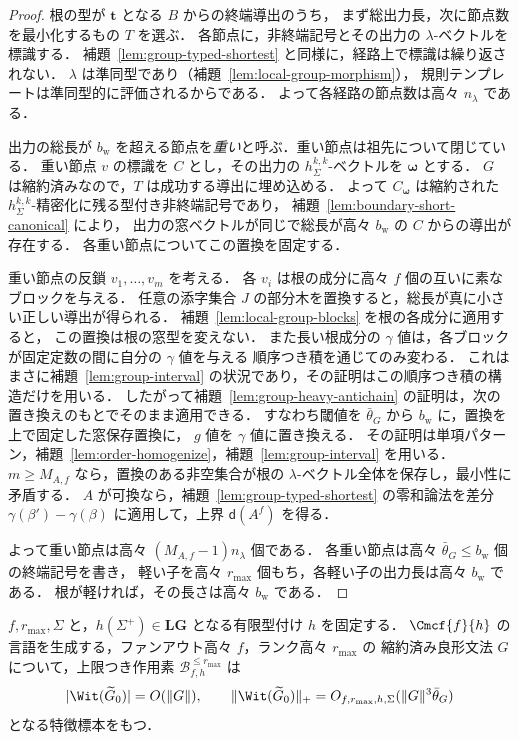 \begin{proof}
根の型が $\mathbf t$ となる $B$ からの終端導出のうち，
まず総出力長，次に節点数を最小化するもの $T$ を選ぶ．
各節点に，非終端記号とその出力の $\lambda$-ベクトルを標識する．
補題~\ref{lem:group-typed-shortest} と同様に，経路上で標識は繰り返されない．
$\lambda$ は準同型であり（補題~\ref{lem:local-group-morphism}），
規則テンプレートは準同型的に評価されるからである．
よって各経路の節点数は高々 $n_\lambda$ である．

出力の総長が $b_{\mathrm w}$ を超える節点を\emph{重い}と呼ぶ．重い節点は祖先について閉じている．
重い節点 $v$ の標識を $C$ とし，その出力の $h^{k,k}_\Sigma$-ベクトルを $\boldsymbol\omega$ とする．
$G$ は縮約済みなので，$T$ は成功する導出に埋め込める．
よって $C_{\boldsymbol\omega}$ は縮約された $h^{k,k}_\Sigma$-精密化に残る型付き非終端記号であり，
補題~\ref{lem:boundary-short-canonical} により，
出力の窓ベクトルが同じで総長が高々 $b_{\mathrm w}$ の $C$ からの導出が存在する．
各重い節点についてこの置換を固定する．

重い節点の反鎖 $v_1,\ldots,v_m$ を考える．
各 $v_i$ は根の成分に高々 $f$ 個の互いに素なブロックを与える．
任意の添字集合 $J$ の部分木を置換すると，総長が真に小さい正しい導出が得られる．
補題~\ref{lem:local-group-blocks} を根の各成分に適用すると，
この置換は根の窓型を変えない．
また長い根成分の $\gamma$ 値は，各ブロックが固定定数の間に自分の $\gamma$ 値を与える
順序つき積を通じてのみ変わる．
これはまさに補題~\ref{lem:group-interval} の状況であり，その証明はこの順序つき積の構造だけを用いる．
したがって補題~\ref{lem:group-heavy-antichain} の証明は，次の置き換えのもとでそのまま適用できる．
すなわち閾値を $\bar\theta_G$ から $b_{\mathrm w}$ に，置換を上で固定した窓保存置換に，
$g$ 値を $\gamma$ 値に置き換える．
その証明は単項パターン，補題~\ref{lem:order-homogenize}，補題~\ref{lem:group-interval} を用いる．
$m\ge M_{A,f}$ なら，置換のある非空集合が根の $\lambda$-ベクトル全体を保存し，最小性に矛盾する．
$A$ が可換なら，補題~\ref{lem:group-typed-shortest} の零和論法を差分
$\gamma(\beta')-\gamma(\beta)$ に適用して，上界 $\mathsf d(A^f)$ を得る．

よって重い節点は高々 $(M_{A,f}-1)n_\lambda$ 個である．
各重い節点は高々 $\bar\theta_G\le b_{\mathrm w}$ 個の終端記号を書き，
軽い子を高々 $r_{\max}$ 個もち，各軽い子の出力長は高々 $b_{\mathrm w}$ である．
根が軽ければ，その長さは高々 $b_{\mathrm w}$ である．
\end{proof}

\begin{theorem}[局所群型付けに対する多項式データ]
\label{thm:local-group-polydata}
$f,r_{\max},\Sigma$ と，$h(\Sigma^+)\in\mathbf{LG}$ となる有限型付け $h$ を固定する．
$\Cmcf{f}{h}$ の言語を生成する，ファンアウト高々 $f$，ランク高々 $r_{\max}$ の
縮約済み良形文法 $G$ について，上限つき作用素 $\mathcal B^{\le r_{\max}}_{f,h}$ は
\[
 |\Wit(\widetilde G_0)|=O(\|G\|),\qquad
 \|\Wit(\widetilde G_0)\|_+=O_{f,r_{\max},h,\Sigma}(\|G\|^3\bar\theta_G)
\]
となる特徴標本をもつ．
\end{theorem}

